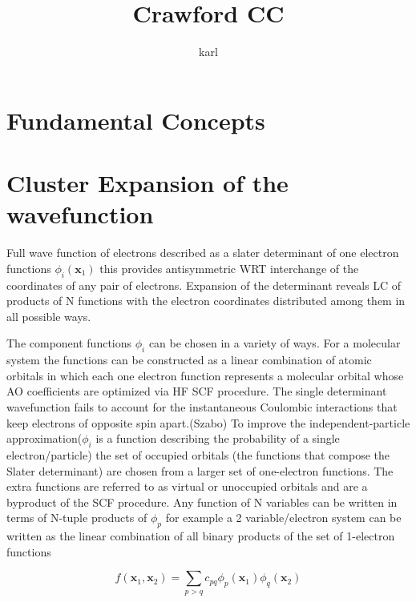 \documentclass[10pt, draft]{article}
\begin{document}
\title{Crawford CC}
\maketitle
\author{karl}
\raggedright
 \vspace{5mm}
 

\section*{Fundamental Concepts}

\section{Cluster Expansion of the wavefunction}
Full wave function of electrons described as a slater determinant of one electron functions $\phi_i(\textbf{x}_1)$ this provides antisymmetric WRT interchange of the coordinates of any pair of electrons.  Expansion of the determinant reveals LC of products of N functions with the electron coordinates distributed among them in all possible ways.  \linebreak[1]

The component functions $\phi_i$ can be chosen in a variety of ways.  For a molecular system the functions can be constructed as a linear combination of atomic orbitals in which each one electron function represents a molecular orbital whose AO coefficients are optimized via HF SCF procedure.  The single determinant wavefunction fails to account for the instantaneous Coulombic interactions that keep electrons of opposite spin apart.(Szabo)  To improve the independent-particle approximation($\phi_i$ is a function describing the probability of a single electron/particle)  the set of occupied orbitals (the functions that compose the Slater determinant) are chosen from a larger set of one-electron functions.  The extra functions are referred to as virtual or unoccupied orbitals and are a byproduct of the SCF procedure.  Any function of N variables can be written in terms of N-tuple products of $\phi_p$ for example a 2 variable/electron system can be written as the linear combination of all binary products of the set of 1-electron functions 

\[f(\textbf{x}_1,\textbf{x}_2) = \sum_{p>q}c_{pq}\phi_p(\textbf{x}_1)\phi_q(\textbf{x}_2)\]
\end{document}
